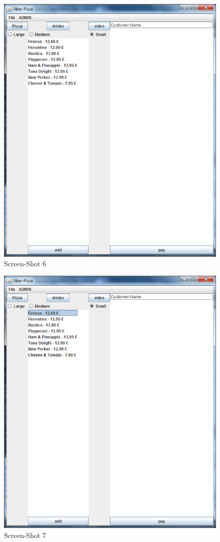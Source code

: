 \documentclass[11pt,a4paper]{article}
\begin{document}
\begin{flushleft}
\begin{figure}[ht]
	\centering
 	\includegraphics[scale = 0.4]{../Sceenshots/Capture5.PNG} 
	\caption{Screen-Shot 6}
\end{figure}

\begin{figure}[ht]
	\centering
 	\includegraphics[scale = 0.4]{../Sceenshots/Capture6.PNG} 
	\caption{Screen-Shot 7}
\end{figure}


\end{flushleft}
\end{document}
